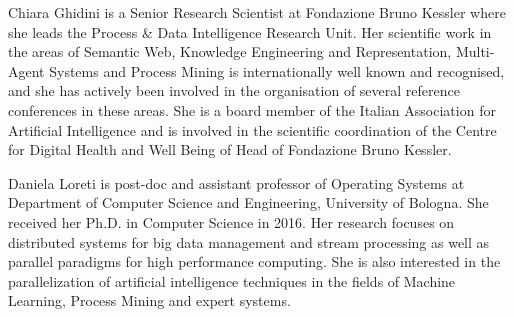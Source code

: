 \documentclass[10pt,journal,compsoc]{IEEEtran}
\theoremstyle{definition}
\theoremstyle{plain}
\begin{document}
\begin{IEEEbiography}{Chiara Ghidini}
is a Senior Research Scientist at Fondazione Bruno Kessler where she leads the Process \& Data Intelligence Research Unit.  
Her scientific work in the areas of Semantic Web, Knowledge Engineering and Representation, Multi-Agent Systems and Process Mining is internationally well known and recognised, and she has actively been involved in the organisation of several reference conferences in these areas. She is a board member of the Italian Association for Artificial Intelligence and is involved in the scientific coordination of the Centre for Digital Health and Well Being of Head of Fondazione Bruno Kessler.
\end{IEEEbiography}

\begin{IEEEbiography}{Daniela Loreti}
is post-doc and assistant professor of Operating Systems at Department of Computer Science and Engineering, University of Bologna. She received her Ph.D. in Computer Science in 2016. 
Her research focuses on distributed systems for big data management and stream processing as well as parallel paradigms for high performance computing. She is also interested in the parallelization of artificial intelligence techniques in the fields of Machine Learning, Process Mining and expert systems.
\end{IEEEbiography}
\end{document}
